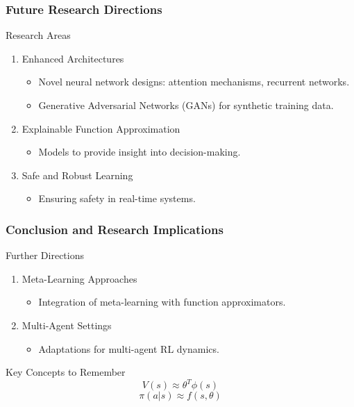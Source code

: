 \documentclass[aspectratio=169]{beamer}
\begin{document}
\begin{frame}[fragile]
    \frametitle{Future Research Directions}
    \begin{block}{Research Areas}
        \begin{enumerate}
            \item Enhanced Architectures
                \begin{itemize}
                    \item Novel neural network designs: attention mechanisms, recurrent networks.
                    \item Generative Adversarial Networks (GANs) for synthetic training data.
                \end{itemize}
            \item Explainable Function Approximation
                \begin{itemize}
                    \item Models to provide insight into decision-making.
                \end{itemize}
            \item Safe and Robust Learning
                \begin{itemize}
                    \item Ensuring safety in real-time systems.
                \end{itemize}
        \end{enumerate}
    \end{block}
\end{frame}

\begin{frame}[fragile]
    \frametitle{Conclusion and Research Implications}
    \begin{block}{Further Directions}
        \begin{enumerate}
            \item Meta-Learning Approaches
                \begin{itemize}
                    \item Integration of meta-learning with function approximators.
                \end{itemize}
            \item Multi-Agent Settings
                \begin{itemize}
                    \item Adaptations for multi-agent RL dynamics.
                \end{itemize}
        \end{enumerate}
    \end{block}
    \begin{block}{Key Concepts to Remember}
        \begin{equation}
            V(s) \approx \theta^T \phi(s)
        \end{equation}
        \begin{equation}
            \pi(a|s) \approx f(s, \theta)
        \end{equation}
    \end{block}
\end{frame}
\end{document}
